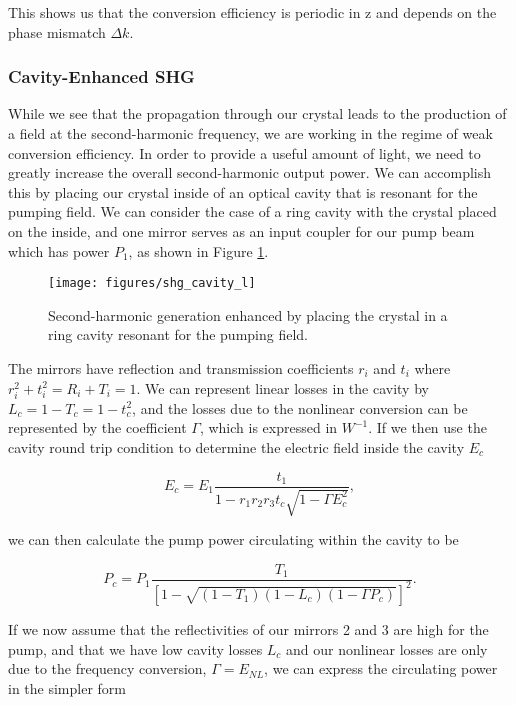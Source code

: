 \noindent
This shows us that the conversion efficiency is periodic in z and depends on the phase mismatch $\Delta k$.

\subsubsection{Cavity-Enhanced SHG} 
\label{cavity_enhanced_shg} 

While we see that the propagation through our crystal leads to the production of a field at the second-harmonic frequency, we are working in the regime of weak conversion efficiency.  In order to provide a useful amount of light, we need to greatly increase the overall second-harmonic output power.  We can accomplish this by placing our crystal inside of an optical cavity that is resonant for the pumping field.  We can consider the case of a ring cavity with the crystal placed on the inside, and one mirror serves as an input coupler for our pump beam which has power $P_1$, as shown in Figure \ref{fig:shg_cavity}.

\begin{figure}[ht] 
 \centering   
 \texttt{[image: figures/shg\_cavity\_l]}  
 \caption[Cavity-enhanced SHG]{Second-harmonic generation enhanced by placing
the crystal in a ring cavity resonant for the pumping field.}
 \label{fig:shg_cavity}    
\end{figure}

The mirrors have reflection and transmission coefficients $r_i$ and $t_i$
where $r_i^2 + t_i^2 = R_i + T_i = 1$.  We can represent linear losses in the
cavity by $L_c = 1-T_c = 1-t^2_c$, and the losses due to the nonlinear
conversion can be represented by the coefficient $\Gamma$, which is expressed in
$W^{-1}$.  If we then use the cavity round trip condition to determine the electric field inside the cavity $E_c$

\begin{equation}
  \label{eq:e_intracavity}
  E_c = E_1 \frac{t_1}{1-r_1r_2r_3t_c\sqrt{1-\Gamma E_c^2} }  ,
\end{equation}

\noindent
we can then calculate the pump power circulating within the cavity \cite{letargat2005} to be  

\begin{equation}
  \label{eq:p_intracavity}
  P_c = P_1 \frac{T_1}{[1-\sqrt{(1-T_1)(1-L_c)(1-\Gamma P_c)}]^2} .
\end{equation}

\noindent
If we now assume that the reflectivities of our mirrors 2 and 3 are high for the pump, and that we have low cavity losses $L_c$ and our nonlinear losses are only due to the frequency conversion, $\Gamma = E_{NL}$, we can express the circulating power in the simpler form
 
